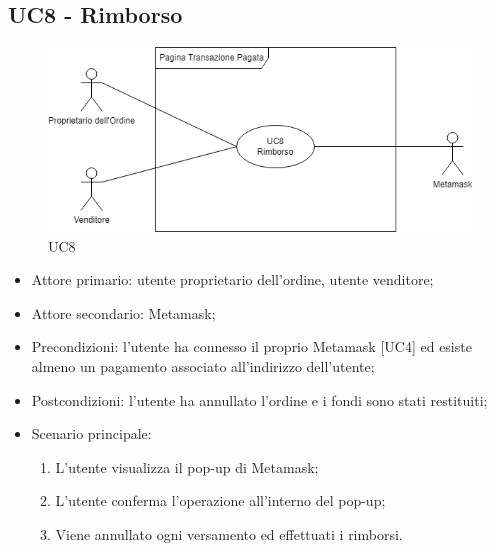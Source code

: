 \subsection{UC8 - Rimborso}

\begin{figure}[H]
    \centering
    \includegraphics[scale=0.7]{immagini/UC8.png}
    \caption{UC8}
\end{figure}

\begin{itemize}
    \item Attore primario: utente proprietario dell'ordine, utente venditore;
    \item Attore secondario: Metamask\glo{};
    \item Precondizioni: l'utente ha connesso il proprio Metamask\glo{} [UC4] ed esiste almeno un pagamento associato all'indirizzo dell'utente;
    \item Postcondizioni: l'utente ha annullato l'ordine e i fondi sono stati restituiti;
    \item Scenario principale:
          \begin{enumerate}
              \item L'utente visualizza il pop-up di Metamask\glo{};
              \item L'utente conferma l'operazione all'interno del pop-up;
              \item Viene annullato ogni versamento ed effettuati i rimborsi.
          \end{enumerate}
\end{itemize}

\clearpage
